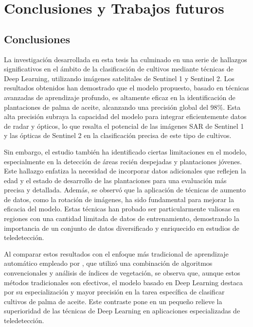 \section{Conclusiones y Trabajos futuros}

\subsection{Conclusiones}

La investigación desarrollada en esta tesis ha culminado en una serie de hallazgos significativos en el ámbito de la clasificación de cultivos mediante técnicas de Deep Learning, utilizando imágenes satelitales de Sentinel 1 y Sentinel 2. Los resultados obtenidos han demostrado que el modelo propuesto, basado en técnicas avanzadas de aprendizaje profundo, es altamente eficaz en la identificación de plantaciones de palma de aceite, alcanzando una precisión global del 98\%. Esta alta precisión subraya la capacidad del modelo para integrar eficientemente datos de radar y ópticos, lo que resalta el potencial de las imágenes SAR de Sentinel 1 y las ópticas de Sentinel 2 en la clasificación precisa de este tipo de cultivos.

Sin embargo, el estudio también ha identificado ciertas limitaciones en el modelo, especialmente en la detección de áreas recién despejadas y plantaciones jóvenes. Este hallazgo enfatiza la necesidad de incorporar datos adicionales que reflejen la edad y el estado de desarrollo de las plantaciones para una evaluación más precisa y detallada. Además, se observó que la aplicación de técnicas de aumento de datos, como la rotación de imágenes, ha sido fundamental para mejorar la eficacia del modelo. Estas técnicas han probado ser particularmente valiosas en regiones con una cantidad limitada de datos de entrenamiento, demostrando la importancia de un conjunto de datos diversificado y enriquecido en estudios de teledetección.

Al comparar estos resultados con el enfoque más tradicional de aprendizaje automático empleado por \cite{diaz2023}, que utilizó una combinación de algoritmos convencionales y análisis de índices de vegetación, se observa que, aunque estos métodos tradicionales son efectivos, el modelo basado en Deep Learning destaca por su especialización y mayor precisión en la tarea específica de clasificar cultivos de palma de aceite. Este contraste pone en un pequeño relieve la superioridad de las técnicas de Deep Learning en aplicaciones especializadas de teledetección.


